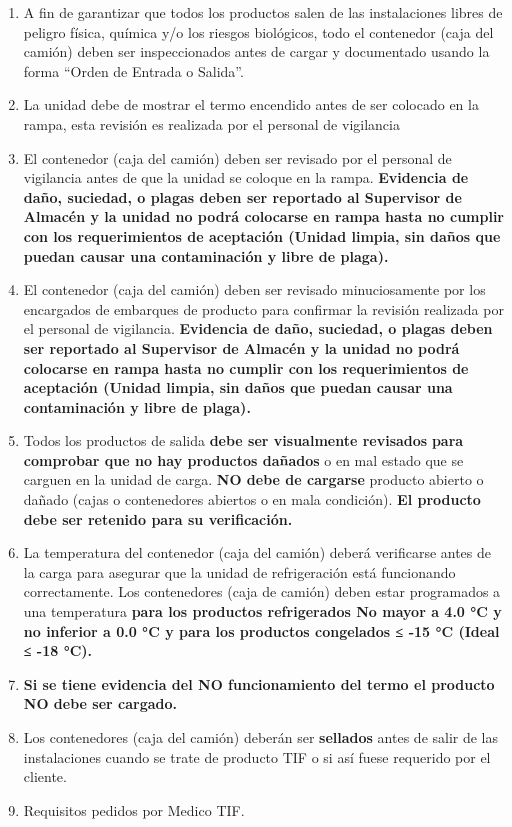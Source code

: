 \begin{enumerate}
	\item A fin de garantizar que todos los productos salen de las instalaciones libres de peligro física, química y/o los riesgos biológicos, todo el contenedor (caja del camión) deben ser inspeccionados antes de cargar y documentado usando la forma “Orden de Entrada o Salida”.
	\item La unidad debe de mostrar el termo encendido antes de ser colocado en la rampa, esta revisión es realizada por el personal de vigilancia
	\item El contenedor (caja del camión) deben ser revisado por el personal de vigilancia antes de que la unidad se coloque en la rampa. \textbf{Evidencia de daño, suciedad, o plagas deben ser reportado al Supervisor de Almacén y la unidad no podrá colocarse en rampa hasta no cumplir con los requerimientos de aceptación (Unidad limpia, sin daños que puedan causar una contaminación y libre de plaga).}
	\item El contenedor (caja del camión) deben ser revisado minuciosamente por los encargados de embarques de producto para confirmar la revisión realizada por el personal de vigilancia. \textbf{Evidencia de daño, suciedad, o plagas deben ser reportado al Supervisor de Almacén y la unidad no podrá colocarse en rampa hasta no cumplir con los requerimientos de aceptación (Unidad limpia, sin daños que puedan causar una contaminación y libre de plaga).}
	\item Todos los productos de salida \textbf{debe ser visualmente revisados} \textbf{para comprobar que no hay productos dañados} o en mal estado que se carguen en la unidad de carga. \textbf{NO debe de cargarse} producto abierto o dañado (cajas o contenedores abiertos o en mala condición). \textbf{El producto debe ser retenido para su verificación.}
	\item La temperatura del contenedor (caja del camión) deberá verificarse antes de la carga para asegurar que la unidad de refrigeración está funcionando correctamente. Los contenedores (caja de camión) deben estar programados a una temperatura \textbf{para los productos refrigerados No mayor a 4.0 °C y no inferior a 0.0 °C y para los productos congelados ≤ -15 °C (Ideal ≤ -18 °C).}
	\item \textbf{Si se tiene evidencia del NO funcionamiento del termo el producto NO debe ser cargado.}
	\item Los contenedores (caja del camión) deberán ser \textbf{sellados} antes de salir de las instalaciones cuando se trate de producto TIF o si así fuese requerido por el cliente.
	\item Requisitos pedidos por Medico TIF.
\end{enumerate}

